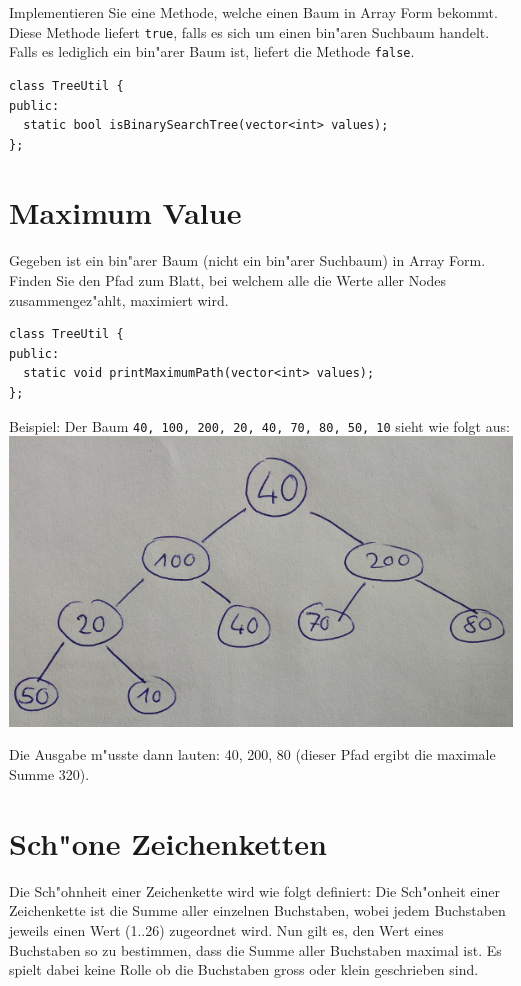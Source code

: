 \documentclass[a4paper,10pt]{article}
\begin{document}
Implementieren Sie eine Methode, welche einen Baum in Array Form bekommt. Diese Methode
liefert \verb|true|, falls es sich um einen bin"aren Suchbaum handelt. Falls es lediglich
ein bin"arer Baum ist, liefert die Methode \verb|false|.

\begin{lstlisting}
class TreeUtil {
public:
  static bool isBinarySearchTree(vector<int> values);
};
\end{lstlisting}

\section{Maximum Value}
Gegeben ist ein bin"arer Baum (nicht ein bin"arer Suchbaum) in Array Form. Finden Sie den Pfad
zum Blatt, bei welchem alle die Werte aller Nodes zusammengez"ahlt, maximiert wird.

\begin{lstlisting}
class TreeUtil {
public:
  static void printMaximumPath(vector<int> values);
};
\end{lstlisting}

Beispiel: Der Baum \verb|40, 100, 200, 20, 40, 70, 80, 50, 10| sieht wie folgt aus:\\
\vspace{3mm}
\includegraphics[scale=0.3]{tree2}
\vspace{3mm}

Die Ausgabe m"usste dann lauten: 40, 200, 80 (dieser Pfad ergibt die maximale Summe 320).	

\section{Sch"one Zeichenketten}
Die Sch"ohnheit einer Zeichenkette wird wie folgt definiert: Die Sch"onheit einer
Zeichenkette ist die Summe aller einzelnen Buchstaben, wobei jedem Buchstaben jeweils einen Wert
(1..26) zugeordnet wird. Nun gilt es, den Wert eines Buchstaben so zu bestimmen, dass die Summe aller Buchstaben
maximal ist. Es spielt dabei keine Rolle ob die Buchstaben gross oder klein geschrieben
sind.
\end{document}
